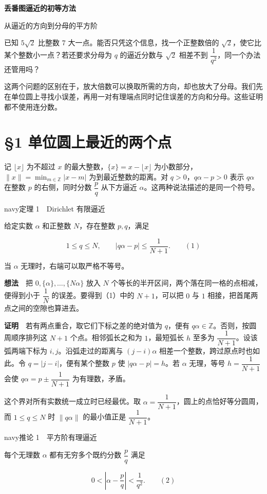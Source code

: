 \documentclass[11pt,a4paper]{article}
\newcommand{\articleheading}[1]{\section{#1}}
\begin{document}
\thispagestyle{plain}
\begin{center}{\LARGE\bfseries 丢番图逼近的初等方法\par}\vspace{5pt}
{\large 从逼近的方向到分母的平方阶\par}\end{center}

已知 $5\sqrt 2$ 比整数 $7$ 大一点。能否只凭这个信息，找一个正整数倍的 $\sqrt 2$，使它比某个整数小一点？若还要求分母为 $q$ 的逼近分数与 $\sqrt 2$ 相差不到 $\dfrac{1}{q^2}$，同一个办法还管用吗？

这两个问题的区别在于，放大倍数可以换取所需的方向，却也放大了分母。我们先在单位圆上寻找小误差，再用一对有理端点同时记住误差的方向和分母。这些证明都不使用连分数。

\articleheading{§1 单位圆上最近的两个点}

记 $\lfloor x\rfloor$ 为不超过 $x$ 的最大整数，$\{x\}=x-\lfloor x\rfloor$ 为小数部分，$\|x\|=\min_{m\in\mathbb Z}|x-m|$ 为到最近整数的距离。对 $q>0$，$q\alpha-p>0$ 表示 $q\alpha$ 在整数 $p$ 的右侧，同时分数 $\dfrac pq$ 从下方逼近 $\alpha$。这两种说法描述的是同一个符号。

\begin{sboxenv}{navy}{定理 1　Dirichlet 有限逼近}

给定实数 $\alpha$ 和正整数 $N$，存在整数 $p,q$，满足

\[
1\le q\le N,\qquad |q\alpha-p|\le\frac{1}{N+1}.\qquad\mathrm{(1)}
\]

当 $\alpha$ 无理时，右端可以取严格不等号。
\end{sboxenv}

\textbf{想法}　把 $0,\{\alpha\},\ldots,\{N\alpha\}$ 放入 $N$ 个等长的半开区间，两个落在同一格的点相减，便得到小于 $\dfrac1N$ 的误差。要得到（1）中的 $N+1$，可以把 $0$ 与 $1$ 相接，把首尾两点之间的空隙也算进去。

\textbf{证明}　若有两点重合，取它们下标之差的绝对值为 $q$，便有 $q\alpha\in\mathbb Z$。否则，按圆周顺序排列这 $N+1$ 个点。相邻弧长之和为 $1$，最短弧长 $h$ 至多为 $\dfrac{1}{N+1}$。设该弧两端下标为 $i,j$。沿弧走过的距离与 $(j-i)\alpha$ 相差一个整数，跨过原点时也如此。令 $q=|j-i|$，便有某个整数 $p$ 使 $|q\alpha-p|=h$。若 $\alpha$ 无理，等号 $h=\dfrac1{N+1}$ 会使 $q\alpha=p\pm\dfrac1{N+1}$ 为有理数，矛盾。

这个界对所有实数统一成立时已经最优。取 $\alpha=\dfrac1{N+1}$，圆上的点恰好等分圆周，而 $1\le q\le N$ 时 $\|q\alpha\|$ 的最小值正是 $\dfrac1{N+1}$。

\begin{sboxenv}{navy}{推论 1　平方阶有理逼近}

每个无理数 $\alpha$ 都有无穷多个既约分数 $\dfrac pq$ 满足

\[
0<\left|\alpha-\frac pq\right|<\frac1{q^2}.\qquad\mathrm{(2)}
\]
\end{sboxenv}
\end{document}
